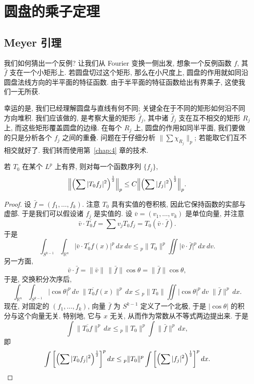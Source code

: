 \chapter{圆盘的乘子定理}
\label{chap:7}

\section{Meyer 引理}
\label{sec:7.1}

我们如何猜出一个反例? 让我们从 Fourier 变换一侧出发, 想象一个反例函数 $f$, 其 $\hat{f}$ 支在一个小矩形上. 若圆盘切过这个矩形, 那么在小尺度上, 圆盘的作用就如同沿圆盘法线方向的半平面的特征函数. 由于半平面的特征函数给出有界乘子, 这使我们一无所获.

幸运的是, 我们已经理解圆盘与直线有何不同; 关键全在于不同的矩形如何沿不同方向堆积. 我们应该做的, 是考察大量的矩形 $\hat{f}_j$, 其中诸 $\hat{f}_j$ 支在互不相交的矩形 $R_j$ 上, 而这些矩形覆盖圆盘的边缘. 在每个 $R_j$ 上, 圆盘的作用如同半平面, 我们要做的只是分析各个 $f_j$ 之间的重叠. 问题在于仔细分析 $\bigl\|\sum\chi_{R_j}\bigr\|_p$; 若能取它们互不相交就好了. 我们转而使用第~\ref{chap:4} 章的技术.

\begin{theorem}\label{thm:7.1}
若 $T_0$ 在某个 $L^p$ 上有界, 则对每一个函数序列 $\{f_j\}$,
\[
\Bigl\|\Bigl(\sum|T_{0}f_{j}|^{2}\Bigr)^{\frac{1}{2}}\Bigr\|_{p}\leq C\Bigl\|\Bigl(\sum|f_{j}|^{2}\Bigr)^{\frac{1}{2}}\Bigr\|_{p}.
\]
\end{theorem}

\begin{proof}
设 $\bar{f}=(f_1,\ldots,f_k)$. 注意 $T_0$ 具有实值的卷积核, 因此它保持函数的实部与虚部. 于是我们可以假设诸 $f_j$ 是实值的. 设 $\bar{v}=(v_1,\ldots,v_k)$ 是单位向量, 并注意
\[
\bar{v}\cdot\overline{T_{0}f}=\sum v_{j}T_{0}f_{j}=T_{0}(\bar{v}\cdot\bar{f}).
\]
于是
\[
\int_{S^{k-1}}\int_{\mathbb{R}^{n}}\bigl|\bar{v}\cdot\overline{T_{0}f}(x)\bigr|^{p}\,dx\,dv
\leq{}_{p}\|T_{0}\|^{p}\iint\bigl|\bar{v}\cdot\bar{f}\bigr|^{p}\,dx\,dv.
\]
另一方面,
\[
\bar{v}\cdot\bar{f}=\|\bar{v}\|\,\|\bar{f}\|\cos\theta=\|\bar{f}\|\cos\theta,
\]
于是, 交换积分次序后,
\[
\int_{\mathbb{R}^{n}}\int_{S^{k-1}}|\cos\theta|^{p}\,dv\;\bigl\|\overline{T_{0}f}(x)\bigr\|^{p}\,dx
\leq{}_{p}\|T_{0}\|\iint|\cos\theta|^{p}\,dv\;\|\bar{f}\|^{p}\,dx.
\]
现在, 对固定的 $(f_1,\ldots,f_k)$, 向量 $\bar{f}$ 为 $S^{k-1}$ 定义了一个北极, 于是 $|\cos\theta|$ 的积分与这个向量无关. 特别地, 它与 $x$ 无关, 从而作为常数从不等式两边提出来. 于是
\[
\int\bigl\|\overline{T_{0}f}\bigr\|^{p}\,dx\leq{}_{p}\|T_{0}\|^{p}\int\|\bar{f}\|^{p}\,dx,
\]
即
\[
\int\left[\Bigl(\sum|T_{0}f_{j}|^{2}\Bigr)^{\frac{1}{2}}\right]^{p}dx
\leq{}_{p}\|T_{0}\|^{p}\int\left[\Bigl(\sum|f_{j}|^{2}\Bigr)^{\frac{1}{2}}\right]^{p}dx. \qedhere
\]
\end{proof}

